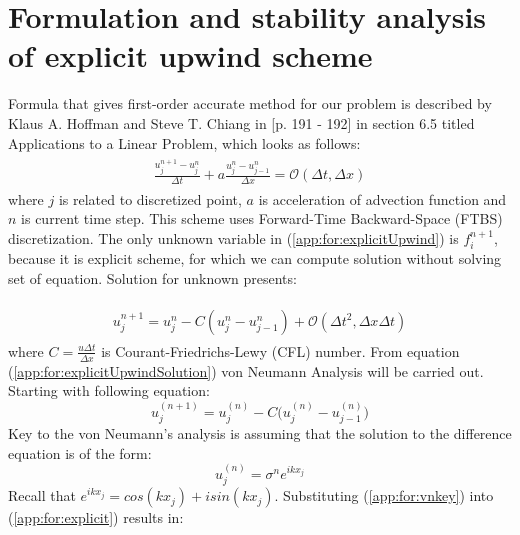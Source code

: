 \section{Formulation and stability analysis of explicit upwind scheme}
	Formula that gives first-order accurate method for our problem is described by Klaus A. Hoffman and Steve T. Chiang in \cite{bib:hoffman}[p. 191 - 192] in section 6.5 titled Applications to a Linear Problem, which looks as follows:
		\begin{align}
			\label{app:for:explicitUpwind}
			\begin{split}
				\frac{u_j^{n+1} - u_j^n}{\Delta t} + a\frac{u_j^n - u_{j-1}^n}{\Delta x} = \mathcal{O}(\Delta t, \Delta x)
			\end{split}
		\end{align}
	where $j$ is related to discretized point, $a$ is acceleration of advection function and $n$ is current time step. This scheme uses Forward-Time Backward-Space (FTBS) discretization.
	The only unknown variable in (\ref{app:for:explicitUpwind}) is $f_i^{n+1}$, because it is explicit scheme, for which we can compute solution without solving set of equation. Solution for unknown presents:
	
		\begin{align}
			\label{app:for:explicitUpwindSolution}
			\begin{split}
				u_j^{n+1} = u_j^n - C(u_j^n - u_{j-1}^n) + \mathcal{O}(\Delta t^2, \Delta x \Delta t)
			\end{split}			
		\end{align}
	where $C=\frac{u\Delta t}{\Delta x}$ is Courant-Friedrichs-Lewy (CFL) number.	
	From equation (\ref{app:for:explicitUpwindSolution}) von Neumann Analysis will be carried out. Starting with following equation:
	\begin{equation}
		\label{app:for:explicit}
		u_j^{(n+1)} = u_j^{(n)} - C\Big(u_j^{(n)} - u_{j-1}^{(n)}\Big)
	\end{equation}	
	Key to the von Neumann's analysis is assuming that the solution to the difference equation is of the form:
	\begin{equation}
		\label{app:for:vnkey}
		u_j^{(n)} = \sigma^ne^{ikx_j}
	\end{equation}	
	Recall that $e^{ikx_j} = cos(kx_j) + isin(kx_j)$. Substituting (\ref{app:for:vnkey}) into (\ref{app:for:explicit}) results in:
	
